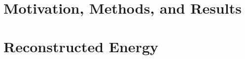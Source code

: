 \documentclass[12pt]{article}
\begin{document}

\section{Motivation, Methods, and Results}

\section{Reconstructed Energy}\label{sec:Reco}

\end{document}
